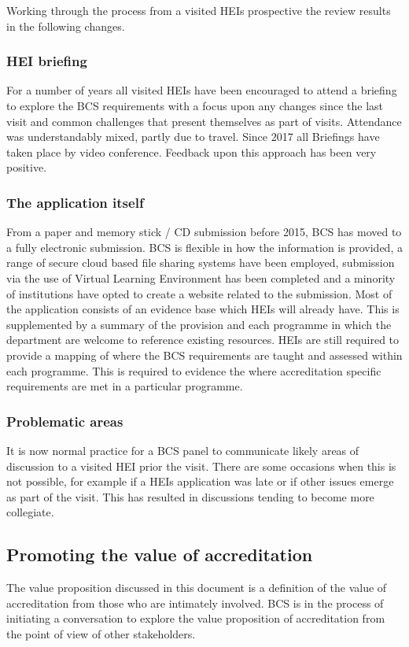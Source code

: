 \documentclass[sigconf]{acmart}
\begin{document}
Working through the process from a visited HEIs prospective the review results in the following changes.

\subsubsection{HEI briefing}
For a number of years all visited HEIs have been encouraged to attend a briefing to explore the BCS requirements with a focus upon any changes since the last visit and common challenges that present themselves as part of visits. Attendance was understandably mixed, partly due to travel. Since 2017 all Briefings have taken place by video conference. Feedback upon this approach has been very positive.

\subsubsection{The application itself}
From a paper and memory stick / CD submission before 2015, BCS has moved to a fully electronic submission. BCS is flexible in how the information is provided, a range of secure cloud based file sharing systems have been employed, submission via the use of Virtual Learning Environment has been completed and a minority of institutions have opted to create a website related to the submission. Most of the application consists of an evidence base which HEIs will already have. This is supplemented by a summary of the provision and each programme in which the department are welcome to reference existing resources. HEIs are still required to provide a mapping of where the BCS requirements are taught and assessed within each programme. This is required to evidence the where accreditation specific requirements are met in a particular programme.

\subsubsection{Problematic areas}
It is now normal practice for a BCS panel to communicate likely areas of discussion to a visited HEI prior the visit. There are some occasions when this is not possible, for example if a HEIs application was late or if other issues emerge as part of the visit.   This has resulted in discussions tending to become more collegiate. 

\subsection{Promoting the value of accreditation}
The value proposition discussed in this document is a definition of the value of accreditation from those who are intimately involved. BCS is in the process of initiating a conversation to explore the value proposition of accreditation from the point of view of other stakeholders.
\end{document}
